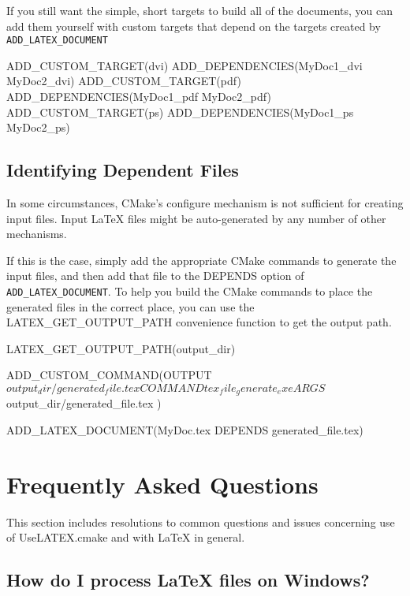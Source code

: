 \documentclass{article}
\newcommand*{\textfile}[1]{\textsf{#1}}
\newcommand*{\textcmake}[1]{\texttt{#1}}
\newcommand*{\UseLATEX}{\textfile{UseLATEX.cmake}\xspace}
\newcommand*{\latex}{\LaTeX\xspace}
\newcommand*{\ald}{\textcmake{ADD\_LATEX\_DOCUMENT}\xspace}
\begin{document}
  If you still want the simple, short targets to build all of the
  documents, you can add them yourself with custom targets that depend on
  the targets created by \ald

  \begin{CodeListing}
ADD_CUSTOM_TARGET(dvi)
ADD_DEPENDENCIES(MyDoc1_dvi MyDoc2_dvi)
ADD_CUSTOM_TARGET(pdf)
ADD_DEPENDENCIES(MyDoc1_pdf MyDoc2_pdf)
ADD_CUSTOM_TARGET(ps)
ADD_DEPENDENCIES(MyDoc1_ps MyDoc2_ps)
  \end{CodeListing}

  \subsection{Identifying Dependent Files}
  \label{sec:IdentifyingDependentFiles}

  In some circumstances, CMake's configure mechanism is not sufficient for
  creating input files.  Input \latex files might be auto-generated by any
  number of other mechanisms.

  If this is the case, simply add the appropriate CMake commands to
  generate the input files, and then add that file to the DEPENDS option of
  \ald.  To help you build the CMake commands to place the generated files
  in the correct place, you can use the LATEX\_GET\_OUTPUT\_PATH convenience
  function to get the output path.

  \begin{CodeListing}
LATEX_GET_OUTPUT_PATH(output_dir)

ADD_CUSTOM_COMMAND(OUTPUT ${output_dir}/generated_file.tex
  COMMAND tex_file_generate_exe
  ARGS ${output_dir}/generated_file.tex
  )

ADD_LATEX_DOCUMENT(MyDoc.tex DEPENDS generated_file.tex)
  \end{CodeListing}


  \section{Frequently Asked Questions}
  \label{sec:FrequentlyAskedQuestions}

  This section includes resolutions to common questions and issues
  concerning use of \UseLATEX and with \latex in general.

  \subsection{How do I process \latex files on Windows?}
  \label{sec:How_do_I_process_latex_files_on_Windows}
\end{document}
